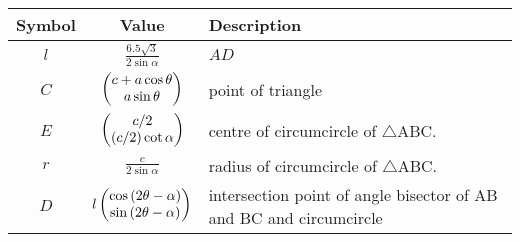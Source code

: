 \begin{tabular}{|c|c|p{3.5cm}|}
\hline
\textbf{Symbol} & \textbf{Value} & \textbf{Description}\\
\hline
$l$ & $\frac{6.5\sqrt{3}}{2\sin \alpha}$ & $AD$\\
\hline
$C$ & $\begin{pmatrix}c+a\cos \theta \\ a\sin \theta\end{pmatrix}$ & point of triangle\\
\hline
$E$ & $\begin{pmatrix}c/2 \\ \left(c/2\right)\cot \alpha\end{pmatrix}$ & centre of circumcircle of $\bigtriangleup$ABC.\\
\hline
$r$ & $\frac{c}{2\sin \alpha}$ & radius of circumcircle of $\bigtriangleup$ABC.\\
\hline
$D$ & $l\begin{pmatrix}\cos \left(2\theta - \alpha\right) \\ \sin \left(2\theta - \alpha\right)\end{pmatrix}$ & intersection point of angle bisector of AB and BC and circumcircle\\
\hline
 \end{tabular}